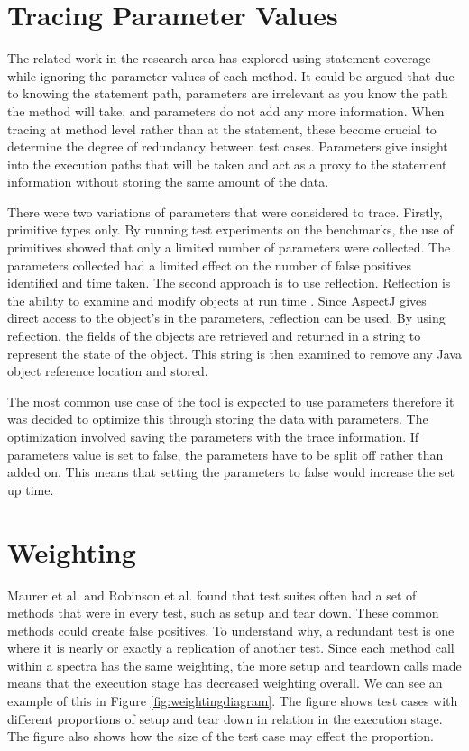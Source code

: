 \section{Tracing Parameter Values}
\label{parameterTrace}
The related work in the research area has explored using statement coverage while ignoring the parameter values of each method. It could be argued that due to knowing the statement path, parameters are irrelevant as you know the path the method will take, and parameters do not add any more information. When tracing at method level rather than at the statement, these become crucial to determine the degree of redundancy between test cases. Parameters give insight into the execution paths that will be taken and act as a proxy to the statement information without storing the same amount of the data.

There were two variations of parameters that were considered to trace. Firstly, primitive types only. By running test experiments on the benchmarks, the use of primitives showed that only a limited number of parameters were collected. The parameters collected had a limited effect on the number of false positives identified and time taken. The second approach is to use reflection. Reflection is the ability to examine and modify objects at run time \cite{oraclereflection}. Since AspectJ gives direct access to the object's in the parameters, reflection can be used. By using reflection, the fields of the objects are retrieved and returned in a string to represent the state of the object. This string is then examined to remove any Java object reference location and stored.

The most common use case of the tool is expected to use parameters therefore it was decided to optimize this through storing the data with parameters. The optimization involved saving the parameters with the trace information. If parameters value is set to false, the parameters have to be split off rather than added on. This means that setting the parameters to false would increase the set up time.

\section{Weighting}
Maurer et al. \cite{koochakzadeh2009test} and Robinson et al. \cite{li2008static} found that test suites often had a set of methods that were in every test, such as setup and tear down. These common methods could create false positives. To understand why, a redundant test is one where it is nearly or exactly a replication of another test. Since each method call within a spectra has the same weighting, the more setup and teardown calls made means that the execution stage has decreased weighting overall. We can see an example of this in Figure \ref{fig:weightingdiagram}. The figure shows test cases with different proportions of setup and tear down in relation in the execution stage. The figure also shows how the size of the test case may effect the proportion.

